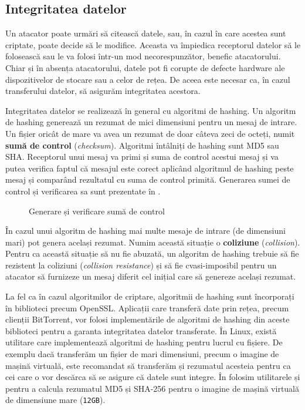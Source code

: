 \subsection{Integritatea datelor}
\label{sec:sec:data:integrity}

Un atacator poate urmări să citească datele, sau, în cazul în care acestea sunt criptate, poate decide să le modifice. Aceasta va împiedica receptorul datelor să le folosească sau le va folosi într-un mod necorespunzător, benefic atacatorului. Chiar și în absența atacatorului, datele pot fi corupte de defecte hardware ale dispozitivelor de stocare sau a celor de rețea. De aceea este necesar ca, în cazul transferului datelor, să asigurăm integritatea acestora.

Integritatea datelor se realizează în general cu algoritmi de hashing. Un algoritm de hashing generează un rezumat de mici dimensiuni pentru un mesaj de intrare. Un fișier oricât de mare va avea un rezumat de doar câteva zeci de octeți, numit \textbf{sumă de control} (\textit{checksum}). Algoritmi întâlniți de hashing sunt MD5 sau SHA. Receptorul unui mesaj va primi și suma de control acestui mesaj și va putea verifica faptul că mesajul este corect aplicând algoritmul de hashing peste mesaj și comparând rezultatul cu suma de control primită. Generarea sumei de control și verificarea sa sunt prezentate în .

\begin{figure}[htbp]
  \centering
  \def\svgwidth{\columnwidth}
  
  \caption{Generare și verificare sumă de control}
  \label{fig:sec:checksum}
\end{figure}

În cazul unui algoritm de hashing mai multe mesaje de intrare (de dimensiuni mari) pot genera același rezumat. Numim această situație o \textbf{coliziune} (\textit{collision}). Pentru ca această situație să nu fie abuzată, un algoritm de hashing trebuie să fie rezistent la coliziuni (\textit{collision resistance}) și să fie cvasi-imposibil pentru un atacator să furnizeze un mesaj diferit cel inițial care să genereze același rezumat.

La fel ca în cazul algoritmilor de criptare, algoritmii de hashing sunt încorporați în biblioteci precum OpenSSL. Aplicații care transferă date prin rețea, precum clienții BitTorrent, vor folosi implementările de algoritmi de hashing din aceste biblioteci pentru a garanta integritatea datelor transferate. În Linux, există utilitare care implementează algoritmi de hashing pentru lucrul cu fișiere. De exemplu dacă transferăm un fișier de mari dimensiuni, precum o imagine de mașină virtuală, este recomandat să transferăm și rezumatul acesteia pentru ca cei care o vor descărca să se asigure că datele sunt integre. În  folosim utilitarele  și  pentru a calcula rezumatul MD5 și SHA-256 pentru o imagine de mașină virtuală de dimensiune mare (\texttt{12GB}).

